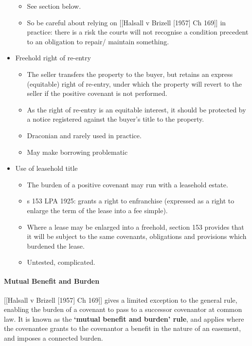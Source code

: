 \documentclass[
]{article}
\providecommand{\tightlist}{%
  \setlength{\itemsep}{0pt}\setlength{\parskip}{0pt}}
\begin{document}
\begin{itemize}
  \begin{itemize}
  \tightlist
  \item
    See section below.
  \item
    So be careful about relying on {[}{[}Halsall v Brizell {[}1957{]} Ch
    169{]}{]} in practice: there is a risk the courts will not recognise
    a condition precedent to an obligation to repair/ maintain
    something.
  \end{itemize}
\item
  Freehold right of re-entry

  \begin{itemize}
  \tightlist
  \item
    The seller transfers the property to the buyer, but retains an
    express (equitable) right of re-entry, under which the property will
    revert to the seller if the positive covenant is not performed.
  \item
    As the right of re-entry is an equitable interest, it should be
    protected by a notice registered against the buyer's title to the
    property.
  \item
    Draconian and rarely used in practice.
  \item
    May make borrowing problematic
  \end{itemize}
\item
  Use of leasehold title

  \begin{itemize}
  \tightlist
  \item
    The burden of a positive covenant may run with a leasehold estate.
  \item
    s 153 LPA 1925: grants a right to enfranchise (expressed as a right
    to enlarge the term of the lease into a fee simple).
  \item
    Where a lease may be enlarged into a freehold, section 153 provides
    that it will be subject to the same covenants, obligations and
    provisions which burdened the lease.
  \item
    Untested, complicated.
  \end{itemize}
\end{itemize}

\hypertarget{mutual-benefit-and-burden}{%
\paragraph{Mutual Benefit and Burden}\label{mutual-benefit-and-burden}}

{[}{[}Halsall v Brizell {[}1957{]} Ch 169{]}{]} gives a limited
exception to the general rule, enabling the burden of a covenant to pass
to a successor covenantor at common law. It is known as the
\textbf{`mutual benefit and burden' rule}, and applies where the
covenantee grants to the covenantor a benefit in the nature of an
easement, and imposes a connected burden.
\end{document}
